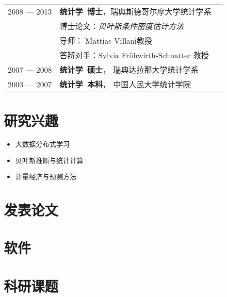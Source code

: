 \documentclass[twoside,a4paper,10pt]{amsart}
\begin{document}
\begin{tabular}{ l  p{} l}
  2008 --- 2013 &\textbf{统计学~博士}，瑞典斯德哥尔摩大学统计学系\\
  & 博士论文：\emph{贝叶斯条件密度估计方法}\\
  & 导师： Mattias Villani教授\\
  & 答辩对手：Sylvia Frühwirth-Schnatter 教授\\

  2007 --- 2008 & \textbf{统计学~硕士}， 瑞典达拉那大学统计学系\\

  2003 --- 2007 & \textbf{统计学~本科}， 中国人民大学统计学院\\
\end{tabular}

\section*{研究兴趣}

\begin{itemize}
\item 大数据分布式学习
\item 贝叶斯推断与统计计算
\item 计量经济与预测方法

\end{itemize}

\section*{发表论文}
\nocite{wang2021uncertainty}
\nocite{kang2021}
\nocite{hao2020bilinear}
\nocite{kang2020gratis}
\nocite{bailey2019changes}
\nocite{li2019credit}
\nocite{li2018improving}
\nocite{pino2018cohort}
\nocite{li2016distributed}
\nocite{li2013bayesian}
\nocite{li2013efficient}
\nocite{li2011modeling}
\nocite{li2010flexible}
\printbibliography[heading=none,  nottype=software]

\section*{软件}
\nocite{gratis}
\nocite{spark-dlsa}
\printbibliography[heading=none, type=software]

\section*{科研课题}
\end{document}
